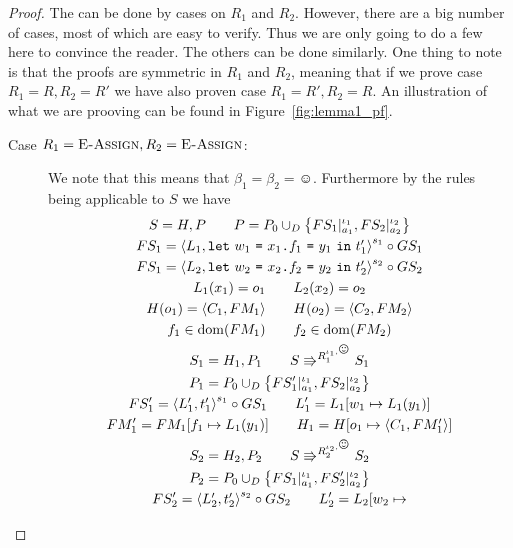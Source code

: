 \begin{proof}
  The can be done by cases on $R_1$ and $R_2$. However, there are a big number
  of cases, most of which are easy to verify. Thus we are only going to do a few
  here to convince the reader. The others can be done similarly. One thing to
  note is that the proofs are symmetric in $R_1$ and $R_2$, meaning that if we
  prove case $R_1 = R, R_2 = R'$ we have also proven case $R_1 = R', R_2 = R$.
  An illustration of what we are prooving can be found in
  Figure~\ref{fig:lemma1_pf}.

  \begin{description}
    \item[Case $R_1 = \mbox{{\sc E-Assign}}, R_2 = \mbox{{\sc E-Assign}}$:] We note that this means that
      $\beta_1 = \beta_2 = \smiley$. Furthermore by the rules being applicable
      to $S$ we have
      \begin{equation}
        \begin{gathered}
          S = H, P \andalso P = P_0 \cup_D \left\{ FS_1|_{a_1}^{\iota_1},
          FS_2|_{a_2}^{\iota_2} \right\} \\
          FS_1 = \xframe{L_1, \Let{w_1}{\FAss{x_1}{f_1}{y_1}}{t'_1}}^{s_1} \circ GS_1
          \\ 
          FS_1 = \xframe{L_2, \Let{w_2}{\FAss{x_2}{f_2}{y_2}}{t'_2}}^{s_2}
          \circ GS_2 \\
          L_1(x_1) = o_1 \andalso L_2(x_2) = o_2 \\
          H(o_1) = \Obj{C_1, FM_1} \andalso H(o_2) = \Obj{C_2, FM_2} \\
          f_1 \in \dom(FM_1) \andalso f_2 \in \dom(FM_2) \\
          S_1 = H_1, P_1 \andalso S \Rrightarrow^{R_1^{\iota_1, \smiley}} S_1
          \\
          P_1 = P_0 \cup_D \left\{ FS'_1|_{a_1}^{\iota_1},
          FS_2|_{a_2}^{\iota_2} \right\} \\
          FS'_1 = \xframe{L'_1, t'_1}^{s_1} \circ GS_1  \andalso L'_1 = L_1[w_1 \mapsto
          L_1(y_1)] \\
          FM'_1 = FM_1[f_1 \mapsto L_1(y_1)] \andalso H_1 = H[o_1 \mapsto
          \Obj{C_1, FM'_1}]
          \\
          S_2 = H_2, P_2 \andalso S \Rrightarrow^{R_2^{\iota_2, \smiley}} S_2
          \\
          P_2 = P_0 \cup_D \left\{ FS_1|_{a_1}^{\iota_1},
          FS'_2|_{a_2}^{\iota_2} \right\} \\
          FS'_2 = \xframe{L'_2, t'_2}^{s_2} \circ GS_2  \andalso L'_2 = L_2[w_2 \mapsto

\end{gathered}
\end{equation}
\end{description}
\end{proof}
